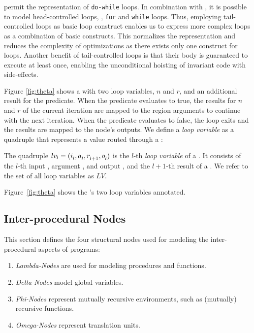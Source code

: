 \thetanodes permit the representation of \verb;do-while; loops. In combination with \gammanodes,
it is possible to model head-controlled loops, \ie, \verb;for; and \verb;while; loops. Thus,
employing tail-controlled loops as basic loop construct enables us to express more complex loops as
a combination of basic constructs. This normalizes the representation and reduces the complexity
of optimizations as there exists only one construct for loops. Another benefit of tail-controlled
loops is that their body is guaranteed to execute at least once, enabling the unconditional
hoisting of invariant code with side-effects.

Figure \ref{fig:theta} shows a \thetanode with two loop variables, $n$ and $r$, and an additional
result for the predicate. When the predicate evaluates to true, the results for $n$ and
$r$ of the current iteration are mapped to the region arguments to continue with the next
iteration. When the predicate evaluates to false, the loop exits and the results are mapped to the
node's outputs. We define a \emph{loop variable} as a quadruple that represents a value routed
through a \thetanode:

\begin{definition}
The quadruple $lv_{l} = (\mbox{$i_{l}^{}$}, \mbox{$a_{l}^{}$}, \mbox{$r_{l+1}^{}$}, \mbox{$o_{l}^{}$})$ is the $l$-th
\emph{loop variable} of a \thetanode. It consists of the $l$-th input , argument
, and output , and the $l+1$-th result of a \thetanode. We refer to
the set of all loop variables as $LV$.
\end{definition}

Figure~\ref{fig:theta} shows the \thetanode's two loop variables annotated.

\subsection{Inter-procedural Nodes}\label{sec:inter-nodes}
This section defines the four structural nodes used for modeling the inter-procedural aspects of
programs:

\begin{enumerate}
	\item \emph{Lambda-Nodes} are used for modeling procedures and functions.
	\item \emph{Delta-Nodes} model global variables.
	\item \emph{Phi-Nodes} represent mutually recursive environments, such as (mutually) recursive
		functions.
	\item \emph{Omega-Nodes} represent translation units.
\end{enumerate}

